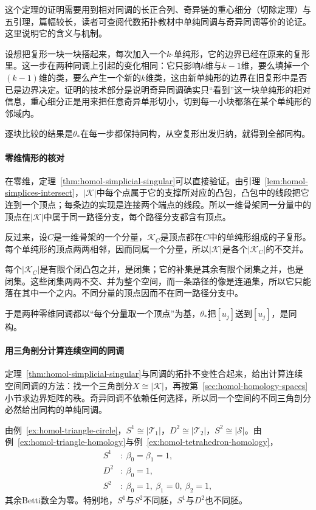 这个定理的证明需要用到相对同调的长正合列、奇异链的重心细分（切除定理）与五引理，篇幅较长，读者可查阅代数拓扑教材中单纯同调与奇异同调等价的论证。这里说明它的含义与机制。

设想把复形一块一块搭起来，每次加入一个$k$-单纯形，它的边界已经在原来的复形里。这一步在两种同调上引起的变化相同：它只影响$k$维与$k-1$维，要么填掉一个$(k-1)$维的类，要么产生一个新的$k$维类，这由新单纯形的边界在旧复形中是否已是边界决定。证明的技术部分是说明奇异同调确实只“看到”这一块单纯形的相对信息，重心细分正是用来把任意奇异单形切小，切到每一小块都落在某个单纯形的邻域内。

逐块比较的结果是$\theta_*$在每一步都保持同构，从空复形出发归纳，就得到全部同构。

\paragraph{零维情形的核对}
在零维，定理~\ref{thm:homol-simplicial-singular}可以直接验证。由引理~\ref{lem:homol-simplices-intersect}，$\lvert\mathcal K\rvert$中每个点属于它的支撑所对应的凸包，凸包中的线段把它连到一个顶点；每条边的实现是连接两个端点的线段。所以一维骨架同一分量中的顶点在$\lvert\mathcal K\rvert$中属于同一路径分支，每个路径分支都含有顶点。

反过来，设$C$是一维骨架的一个分量，$\mathcal K_C$是顶点都在$C$中的单纯形组成的子复形。每个单纯形的顶点两两相邻，因而同属一个分量，所以$\lvert\mathcal K\rvert$是各个$\lvert\mathcal K_C\rvert$的不交并。

每个$\lvert\mathcal K_C\rvert$是有限个闭凸包之并，是闭集；它的补集是其余有限个闭集之并，也是闭集。这些闭集两两不交、并为整个空间，而一条路径的像是连通集，所以它只能落在其中一个之内。不同分量的顶点因而不在同一路径分支中。

于是两种零维同调都以“每个分量取一个顶点”为基，$\theta_*$把$[u_j]$送到$[u_j]$，是同构。

\paragraph{用三角剖分计算连续空间的同调}
定理~\ref{thm:homol-simplicial-singular}与同调的拓扑不变性合起来，给出计算连续空间同调的方法：找一个三角剖分$X\cong\lvert\mathcal K\rvert$，再按第~\ref{sec:homol-homology-spaces}小节求边界矩阵的秩。奇异同调不依赖任何选择，所以同一个空间的不同三角剖分必然给出同构的单纯同调。

\begin{example}[圆周、圆盘与球面的同调]
\label{ex:homol-sphere-homology}
由例~\ref{ex:homol-triangle-circle}，$S^1\cong\lvert\mathcal T_1\rvert$，$D^2\cong\lvert\mathcal T_2\rvert$，$S^2\cong\lvert\mathcal S\rvert$。由例~\ref{ex:homol-triangle-homology}与例~\ref{ex:homol-tetrahedron-homology}，
\[
 \begin{aligned}
 S^1&:\ \beta_0=\beta_1=1,\\
 D^2&:\ \beta_0=1,\\
 S^2&:\ \beta_0=1,\ \beta_1=0,\ \beta_2=1,
 \end{aligned}
\]
其余Betti数全为零。特别地，$S^1$与$S^2$不同胚，$S^1$与$D^2$也不同胚。
\end{example}

